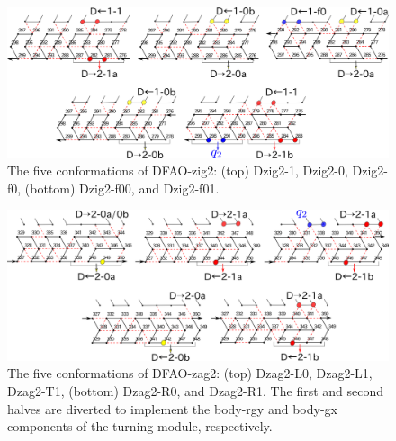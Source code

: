 \begin{figure}[h]
\includegraphics[width=\linewidth]{pic/DFAO-zig2.png}
  \caption{The five conformations of DFAO-zig2: (top) Dzig2-1, Dzig2-0, Dzig2-f0, (bottom) Dzig2-f00, and Dzig2-f01. }
  \label{fig:DFAO-zig2}
\end{figure} 

\begin{figure}[h]
\includegraphics[width=\linewidth]{pic/DFAO-zag2.png}
\caption{The five conformations of DFAO-zag2: (top) Dzag2-L0, Dzag2-L1, Dzag2-T1, (bottom) Dzag2-R0, and Dzag2-R1.
The first and second halves are diverted to implement the body-rgy and body-gx components of the turning module, respectively. 
}
\label{fig:DFAO-zag2}
  \end{figure} 

